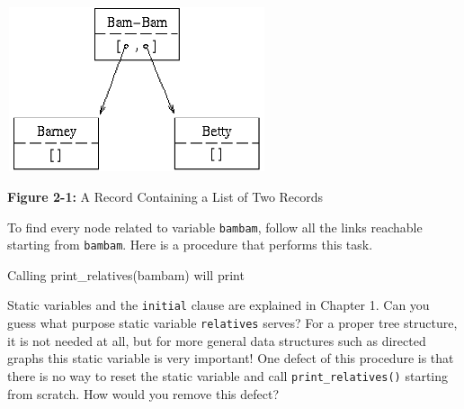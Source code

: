 \begin{center}
\includegraphics[width=3in,height=1.9in]{ub-img/ub-img6.png}
\end{center}

{\sffamily\bfseries Figure 2-1:}
{\sffamily A Record Containing a List of Two Records}

\bigskip

To find every node related to variable \texttt{bambam}, follow all the
links reachable starting from \texttt{bambam}. Here is a procedure that
performs this task.


Calling print\_relatives(bambam) will print


Static variables and the \texttt{initial} clause are explained in
Chapter 1. Can you guess what purpose static variable
\texttt{relatives} serves? For a proper tree structure, it is not
needed at all, but for more general data structures such as directed
graphs this static variable is very important! One defect of this
procedure is that there is no way to reset the static variable and call
\texttt{print\_relatives()} starting from scratch. How would you remove
this defect?

